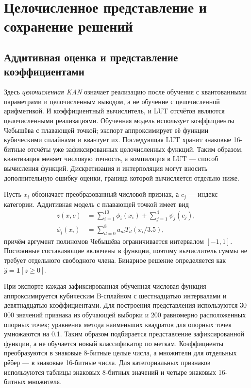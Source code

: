 \section{Целочисленное представление и сохранение решений}
\subsection{Аддитивная оценка и представление коэффициентами}
Здесь \emph{целочисленная KAN} означает реализацию после обучения с квантованными параметрами и целочисленным выводом, а не обучение с целочисленной арифметикой. И коэффициентный вычислитель, и LUT отсчётов являются целочисленными реализациями. Обученная модель использует коэффициенты Чебышёва с плавающей точкой; экспорт аппроксимирует её функции кубическими сплайнами и квантует их. Последующая LUT хранит знаковые 16-битные отсчёты уже зафиксированных целочисленных функций. Таким образом, квантизация меняет числовую точность, а компиляция в LUT --- способ вычисления функций. Дискретизация и интерполяция могут вносить дополнительную ошибку оценки, граница которой вычисляется отдельно ниже.

Пусть $x_i$ обозначает преобразованный числовой признак, а $c_j$ --- индекс категории. Аддитивная модель с плавающей точкой имеет вид
\begin{equation}
\begin{split}
z(x,c)&=\sum_{i=1}^{10}\phi_i(x_i)+\sum_{j=1}^{4}\psi_j(c_j),\\
\phi_i(x_i)&=\sum_{d=0}^{8}a_{id}T_d(x_i/3.5),
\end{split}
\label{eq:additive}
\end{equation}
причём аргумент полиномов Чебышёва ограничивается интервалом $[-1,1]$. Постоянные составляющие включены в функции, поэтому вычислитель суммы не требует отдельного свободного члена. Бинарное решение определяется как $\widehat y=\mathbf 1[z\geq0]$.

При экспорте каждая зафиксированная обученная числовая функция аппроксимируется кубическим B-сплайном с шестнадцатью интервалами и девятнадцатью коэффициентами. Для построения представления используются 30\,000 значений признака из обучающей выборки и 200 равномерно расположенных опорных точек; уравнения метода наименьших квадратов для опорных точек умножаются на 0.1. Таким образом подбирается представление зафиксированной функции, а не обучается новый классификатор по меткам. Коэффициенты преобразуются в знаковые 8-битные целые числа, а множители для отдельных рёбер --- в знаковые 16-битные числа. Для категориальных признаков используются таблицы знаковых 8-битных значений и четыре знаковых 16-битных множителя.


